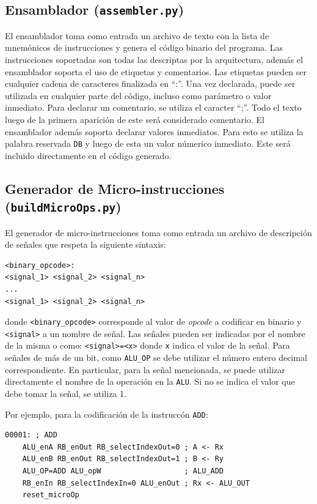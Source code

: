 \documentclass[a4paper,11pt]{article}
\begin{document}
\subsection*{Ensamblador (\texttt{assembler.py})}

El ensamblador toma como entrada un archivo de texto con la lista de mnemónicos de instrucciones y genera el código binario del programa.
Las instrucciones soportadas son todas las descriptas por la arquitectura, además el ensamblador soporta el uso de etiquetas y comentarios.
Las etiquetas pueden ser cualquier cadena de caracteres finalizada en ``:''. Una vez declarada, puede ser utilizada en cualquier parte del código, incluso como parámetro o valor inmediato.
Para declarar un comentario, se utiliza el caracter ``;''.
Todo el texto luego de la primera aparición de este será considerado comentario.
El ensamblador además soporta declarar valores inmediatos.
Para esto se utiliza la palabra reservada \texttt{DB} y luego de esta un valor númerico inmediato.
Este será incluido directamente en el código generado.

\subsection*{Generador de Micro-instrucciones (\texttt{buildMicroOps.py})}

El generador de micro-instrucciones toma como entrada un archivo de descripción de señales que respeta la siguiente sintaxis:

\small
\begin{verbatim}
<binary_opcode>:
<signal_1> <signal_2> <signal_n>
...
<signal_1> <signal_2> <signal_n>
\end{verbatim}
\normalsize

\noindent donde \verb|<binary_opcode>| corresponde al valor de \emph{opcode} a codificar en binario y \verb|<signal>| a un nombre de señal.
Las señales pueden ser indicadas por el nombre de la misma o como: \verb|<signal>=<x>| donde \verb|x| indica el valor de la señal.
Para señales de más de un bit, como \verb|ALU_OP| se debe utilizar el número entero decimal correspondiente.
En particular, para la señal mencionada, se puede utilizar directamente el nombre de la operación en la \texttt{ALU}.
Si no se indica el valor que debe tomar la señal, se utiliza 1.

\noindent Por ejemplo, para la codificación de la instruccón \verb|ADD|:

\small
\begin{verbatim}
00001: ; ADD
    ALU_enA RB_enOut RB_selectIndexOut=0 ; A <- Rx
    ALU_enB RB_enOut RB_selectIndexOut=1 ; B <- Ry
    ALU_OP=ADD ALU_opW                   ; ALU_ADD
    RB_enIn RB_selectIndexIn=0 ALU_enOut ; Rx <- ALU_OUT
    reset_microOp
\end{verbatim}
\normalsize
\end{document}
